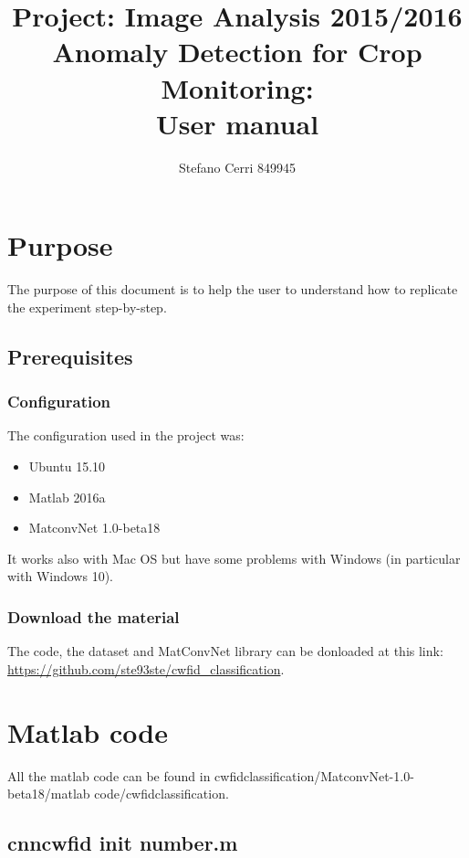 \documentclass[]{report}
\title{Project: Image Analysis 2015/2016\\Anomaly Detection for Crop Monitoring:\\ User manual}
\author{Stefano Cerri 849945}
\begin{document}
\maketitle
\tableofcontents

\chapter{Purpose}

The purpose of this document is to help the user to understand how to replicate the experiment step-by-step.

\section{Prerequisites}

\subsection{Configuration}

The configuration used in the project was:

\begin{itemize}

	\item Ubuntu 15.10
	\item Matlab 2016a
	\item MatconvNet 1.0-beta18

\end{itemize}

It works also with Mac OS but have some problems with Windows (in particular with Windows 10).

\subsection{Download the material}

The code, the dataset and MatConvNet library can be donloaded at this link: \url{https://github.com/ste93ste/cwfid_classification}.
 
\chapter{Matlab code}

All the matlab code can be found in cwfid\textunderscore classification/MatconvNet-1.0-beta18/matlab code/cwfid\textunderscore classification.

\section{cnn\textunderscore cwfid \textunderscore init \textunderscore *number.m}
\end{document}
